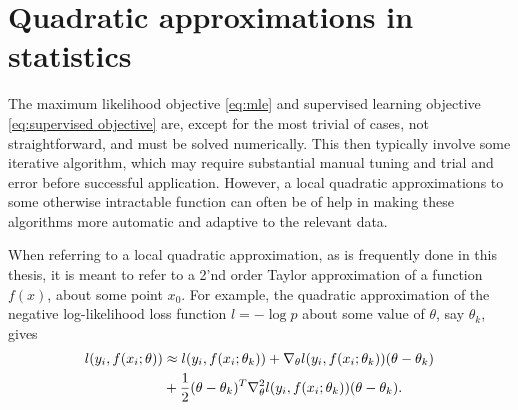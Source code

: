 \chapter{Quadratic approximations in statistics} 


The maximum likelihood objective \eqref{eq:mle} and supervised learning objective \eqref{eq:supervised objective} are, except for the most trivial of cases, not straightforward, and must be solved numerically.
This then typically involve some iterative algorithm, which may require substantial manual tuning and trial and error before successful application. 
However, a local quadratic approximations to some otherwise intractable function can often be of help in making these algorithms more automatic and adaptive to the relevant data.

When referring to a local quadratic approximation, as is frequently done in this thesis, it is meant to refer to a 2'nd order Taylor approximation of a function $f(x)$, about some point $x_0$.
For example, the quadratic approximation of the negative log-likelihood loss function $l=-\log p$ about some value of $\theta$, say $\theta_k$, gives
\begin{align}\label{eq:quadratic approximation}
	l(y_i,f(x_i;\theta))
	&\approx
	l(y_i,f(x_i;\theta_k))
	+ \nabla_\theta l(y_i,f(x_i;\theta_k)) (\theta-\theta_k)\notag\\
	&+ \frac{1}{2}(\theta-\theta_k)^T \nabla_\theta^2 l(y_i,f(x_i;\theta_k)) (\theta-\theta_k).
\end{align}

